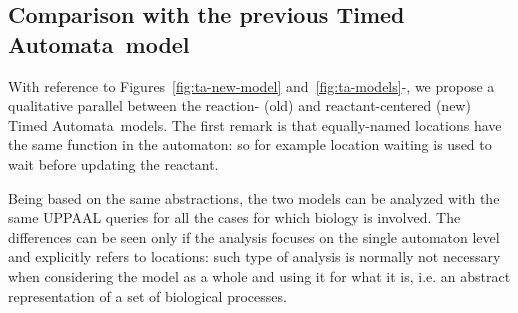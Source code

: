\documentclass{llncs}
\newcommand{\tas}{Timed Automata}
\begin{document}
\subsection{Comparison with the previous \tas\ model}\label{sec:ta-notes}
With reference to Figures~\ref{fig:ta-new-model} and~\ref{fig:ta-models}{\protect{}\--{}\protect{}},
we propose a qualitative parallel between the reaction- (old) and reactant-centered (new) \tas\ models.
The first remark is that equally-named locations have the same function in the automaton: so for
example location {\sf waiting} is used to wait before updating the reactant.

Being based on the same abstractions, the two models can be analyzed with the same
UPPAAL queries for all the cases for which biology is involved. The differences can be seen only if the
analysis focuses on the single automaton level and explicitly refers to locations: such type of analysis
is normally not necessary when considering the model as a whole and using it for what it is, i.e. an
abstract representation of a set of biological processes.
\end{document}

